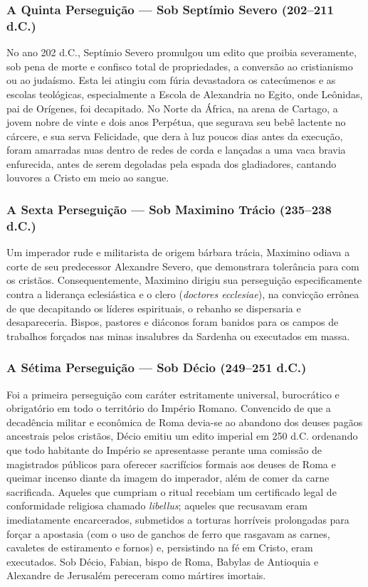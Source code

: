\documentclass[11pt,a4paper,openany]{book}
\begin{document}
\subsubsection*{A Quinta Perseguição — Sob Septímio Severo (202–211 d.C.)}
No ano 202 d.C., Septímio Severo promulgou um edito que proibia severamente, sob pena de morte e confisco total de propriedades, a conversão ao cristianismo ou ao judaísmo. Esta lei atingiu com fúria devastadora os catecúmenos e as escolas teológicas, especialmente a Escola de Alexandria no Egito, onde Leônidas, pai de Orígenes, foi decapitado. No Norte da África, na arena de Cartago, a jovem nobre de vinte e dois anos Perpétua, que segurava seu bebê lactente no cárcere, e sua serva Felicidade, que dera à luz poucos dias antes da execução, foram amarradas nuas dentro de redes de corda e lançadas a uma vaca bravia enfurecida, antes de serem degoladas pela espada dos gladiadores, cantando louvores a Cristo em meio ao sangue.


\subsubsection*{A Sexta Perseguição — Sob Maximino Trácio (235–238 d.C.)}
Um imperador rude e militarista de origem bárbara trácia, Maximino odiava a corte de seu predecessor Alexandre Severo, que demonstrara tolerância para com os cristãos. Consequentemente, Maximino dirigiu sua perseguição especificamente contra a liderança eclesiástica e o clero (\textit{doctores ecclesiae}), na convicção errônea de que decapitando os líderes espirituais, o rebanho se dispersaria e desapareceria. Bispos, pastores e diáconos foram banidos para os campos de trabalhos forçados nas minas insalubres da Sardenha ou executados em massa.


\subsubsection*{A Sétima Perseguição — Sob Décio (249–251 d.C.)}
Foi a primeira perseguição com caráter estritamente universal, burocrático e obrigatório em todo o território do Império Romano. Convencido de que a decadência militar e econômica de Roma devia-se ao abandono dos deuses pagãos ancestrais pelos cristãos, Décio emitiu um edito imperial em 250 d.C. ordenando que todo habitante do Império se apresentasse perante uma comissão de magistrados públicos para oferecer sacrifícios formais aos deuses de Roma e queimar incenso diante da imagem do imperador, além de comer da carne sacrificada. Aqueles que cumpriam o ritual recebiam um certificado legal de conformidade religiosa chamado \textit{libellus}; aqueles que recusavam eram imediatamente encarcerados, submetidos a torturas horríveis prolongadas para forçar a apostasia (com o uso de ganchos de ferro que rasgavam as carnes, cavaletes de estiramento e fornos) e, persistindo na fé em Cristo, eram executados. Sob Décio, Fabian, bispo de Roma, Babylas de Antioquia e Alexandre de Jerusalém pereceram como mártires imortais.
\end{document}
